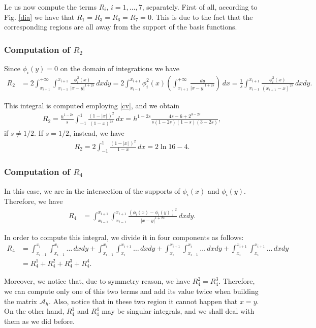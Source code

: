 {Le us now compute the terms $R_i$, $i=1,\ldots,7$, separately. First of all, according to Fig. \ref{dia} we have that $R_1=R_3=R_6=R_7=0.$ This is due to the fact that the corresponding regions are all away from the support of the basis functions. 
\subsubsection*{Computation of $R_2$}
Since $\phi_i(y) = 0$ on the domain of integrations we have
\begin{align*}
	R_2 &= 2\int_{x_{i+1}}^{+\infty}\int_{x_{i-1}}^{x_{i+1}} \frac{\phi_i^2(x)}{|x-y|^{1+2s}}\,dxdy = 2\int_{x_{i-1}}^{x_{i+1}}\phi_i^2(x)\left(\int_{x_{i+1}}^{+\infty} \frac{dy}{|x-y|^{1+2s}}\right)\,dx = \frac{1}{s}\int_{x_{i-1}}^{x_{i+1}}\frac{\phi_i^2(x)}{(x_{i+1}-x)^{2s}}\,dxdy.
\end{align*}

This integral is computed employing \eqref{cv}, and we obtain
\begin{align*}
	R_2 = \frac{h^{1-2s}}{s}\int_{-1}^1 \frac{(1-|x|\,)^2}{(1-x)^{2s}}\,dx = h^{1-2s}\frac{4s-6+2^{3-2s}}{s(1-2s)(1-s)(3-2s)}, 
\end{align*}
if $s\neq 1/2$. If $s=1/2$, instead, we have
\begin{align*}
	R_2 = 2\int_{-1}^1 \frac{(1-|x|\,)^2}{1-x}\,dx = 2\ln 16-4.
\end{align*}

\subsubsection*{Computation of $R_4$}
In this case, we are in the intersection of the supports of $\phi_i(x)$ and $\phi_i(y)$. Therefore, we have
\begin{align*}
	R_4 &= \int_{x_{i-1}}^{x_{i+1}}\int_{x_{i-1}}^{x_{i+1}} \frac{(\phi_i(x)-\phi_i(y))^2}{|x-y|^{1+2s}}\,dxdy. 
\end{align*}

In order to compute this integral, we divide it in four components as follows:
\begin{align*}
	R_4 &= \int_{x_{i-1}}^{x_i}\int_{x_{i-1}}^{x_i} \ldots\,dxdy + \int_{x_{i-1}}^{x_i}\int_{x_i}^{x_{i+1}} \ldots\,dxdy +
	\int_{x_i}^{x_{i+1}}\int_{x_{i-1}}^{x_i} \ldots\,dxdy +  \int_{x_i}^{x_{i+1}}\int_{x_i}^{x_{i+1}} \ldots\,dxdy
	\\
	&= R_4^1 + R_4^2 + R_4^3 + R_4^4.
\end{align*}

Moreover, we notice that, due to symmetry reason, we have $R_4^2 = R_4^3$. Therefore, we can compute only one of this two terms and add its value twice when building the matrix $\mathcal A_h$. Also, notice that in these two region it cannot happen that $x=y$. On the other hand, $R_4^1$ and $R_4^4$ may be singular integrals, and we shall deal with them as we did before. 

}
